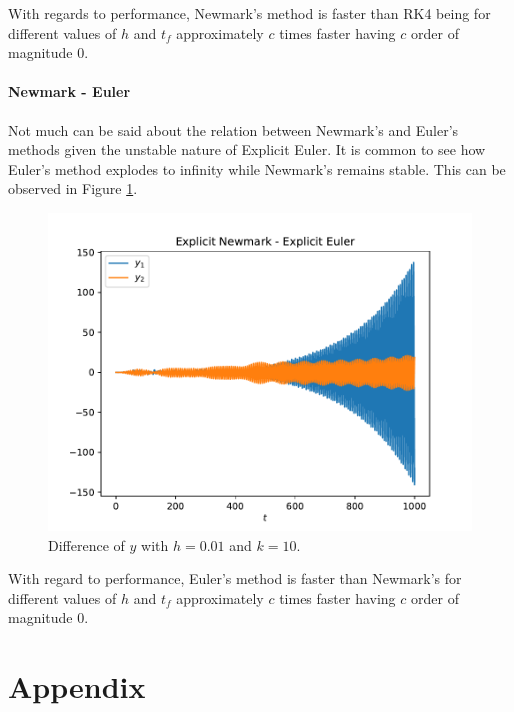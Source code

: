 \documentclass{report}
\begin{document}
With regards to performance, Newmark's method is faster than RK4 being for different values of $h$ and $t_f$ approximately $c$ times faster having $c$ order of magnitude 0.

\subsubsection*{Newmark - Euler}
Not much can be said about the relation between Newmark's and Euler's methods given the unstable nature of Explicit Euler. It is common to see how Euler's method explodes to infinity while Newmark's remains stable. This can be observed in Figure \ref{pl:new_eul}.

\begin{figure}[h]
\centering
\begin{minipage}[t]{0.45\textwidth}
\centering
\includegraphics[width=\textwidth]{../Plots/Diff_Proj3/Real/New-Eul_k=1E1_t=1E3_y}
\caption{Difference of $y$ with $h=0.01$ and $k=10$.}
\label{pl:new_eul}
\end{minipage}
\end{figure}

With regard to performance, Euler's method is faster than Newmark's for different values of $h$ and $t_f$ approximately $c$ times faster having $c$ order of magnitude 0.



\chapter*{Appendix}
\end{document}

